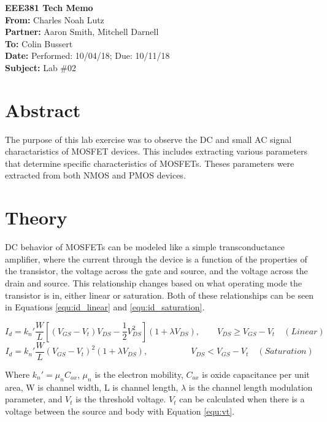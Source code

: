 \documentclass[11pt]{article}
\begin{document}
	{\Huge\textbf{EEE381 Tech Memo}}\\
	\hfill \break
	\textbf{From:} Charles Noah Lutz\\
	\textbf{Partner:} Aaron Smith, Mitchell Darnell\\
	\textbf{To:} Colin Bussert\\
	\textbf{Date:} Performed: 10/04/18; Due: 10/11/18\\
	\textbf{Subject:} Lab \#02

	\section{Abstract}
	The purpose of this lab exercise was to observe the DC and small AC
	signal charactaristics of MOSFET devices. This includes extracting
	various parameters that determine specific characteristics of MOSFETs.
	Theses parameters were extracted from both NMOS and PMOS devices. 
	
	\section{Theory}
	DC behavior of MOSFETs can be modeled like a simple transconductance
	amplifier, where the current through the device is a function of the 
	properties of the transistor, the voltage across the gate and source,
	and the voltage across the drain and source. This relationship changes
	based on what operating mode the transistor is in, either linear or 
	saturation. Both of these relationships can be seen in Equations
	\ref{equ:id_linear} and \ref{equ:id_saturation}.

	\begin{equation}
		\label{equ:id_linear}
		I_d=k_n\prime\frac{W}{L}[(V_{GS}-V_{t})V_{DS} - \frac{1}{2} V_{DS}^2] (1 + \lambda V_{DS}), \qquad V_{DS} \geq V_{GS} - V_{t} \quad(Linear)
	\end{equation}
	\begin{equation}
		\label{equ:id_saturation}
		I_d=k_n\prime \frac{W}{L}(V_{GS}-V_{t})^2 (1+ \lambda V_{DS}), \qquad \qquad \quad V_{DS} < V_{GS}-V_{t} \quad (Saturation)
	\end{equation}
	
	Where \(k_n\prime = \mu_n C_{ox}\), \(\mu_n\) is the electron mobility, \(C_{ox}\)
	is oxide capacitance per unit area, W is channel width, L is channel length,
	\(\lambda\) is the channel length modulation parameter, and \(V_t\) is the 
	threshold voltage. \(V_t\) can be calculated when there is a voltage
	between the source and body with Equation \ref{equ:vt}.
\end{document}
